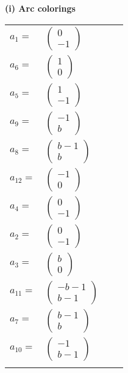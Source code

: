 \documentclass[1p]{elsarticle_modified}
\theoremstyle{definition}
\begin{document}
\flushleft \textbf{(i) Arc colorings}\\
\begin{tabular}{m{7pt} m{180pt} m{7pt} m{180pt} }
\flushright $a_{1}=$&$\begin{pmatrix}0\\-1\end{pmatrix}$ \\
\flushright $a_{6}=$&$\begin{pmatrix}1\\0\end{pmatrix}$ \\
\flushright $a_{5}=$&$\begin{pmatrix}1\\-1\end{pmatrix}$ \\
\flushright $a_{9}=$&$\begin{pmatrix}-1\\b\end{pmatrix}$ \\
\flushright $a_{8}=$&$\begin{pmatrix}b-1\\b\end{pmatrix}$ \\
\flushright $a_{12}=$&$\begin{pmatrix}-1\\0\end{pmatrix}$ \\
\flushright $a_{4}=$&$\begin{pmatrix}0\\-1\end{pmatrix}$ \\
\flushright $a_{2}=$&$\begin{pmatrix}0\\-1\end{pmatrix}$ \\
\flushright $a_{3}=$&$\begin{pmatrix}b\\0\end{pmatrix}$ \\
\flushright $a_{11}=$&$\begin{pmatrix}- b-1\\b-1\end{pmatrix}$ \\
\flushright $a_{7}=$&$\begin{pmatrix}b-1\\b\end{pmatrix}$ \\
\flushright $a_{10}=$&$\begin{pmatrix}-1\\b-1\end{pmatrix}$\\&\end{tabular}
\end{document}

